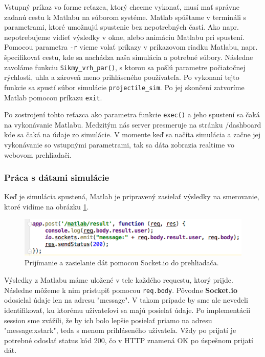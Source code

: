 Vstupný príkaz vo forme reťazca, ktorý chceme vykonať, musí mať správne zadanú cestu k Matlabu na súborom systéme. Matlab spúštame v termináli s parametrami, ktoré umožnujú spustenie bez nepotrebných častí.\cite{matlab-macos} Ako napr. nepotrebujeme vidieť výsledky v okne, alebo animáciu Matlabu pri spustení. Pomocou parametra \verb|-r| vieme volať príkazy v príkazovom riadku Matlabu, napr. špecifikovať cestu, kde sa nachádza naša simulácia a potrebné súbory. Následne zavoláme funkciu \verb|Sikmy_vrh_par()|, s ktorou sa pošlú parametre počiatočnej rýchlosti, uhla a zároveň meno prihláseného používateľa. Po vykonaní tejto funkcie sa spustí súbor simulácie \verb|projectile_sim|. Po jej skončení zatvoríme Matlab pomocou príkazu \verb|exit|.

Po zostrojení tohto reťazca ako parametra funkcie \verb|exec()| a jeho spustení sa čaká na vykonávanie Matlabu. Medzitým nás server presmeruje na stránku /dashboard kde sa čaká na údaje zo simulácie. V momente keď sa načíta simulácia a začne jej vykonávanie so vstupnými parametrami, tak sa dáta zobrazia realtime vo webovom prehliadači.

\subsubsection{Práca s dátami simulácie}
Keď je simulácia spustená, Matlab je pripravený zasielať výsledky na smerovanie, ktoré vidíme na obrázku \ref{img-express-socketio}. 

\begin{figure}[H]
  \centering
  \includegraphics[scale=0.7]{img/code/express-socketio.png}
  \caption{Prijímanie a zasielanie dát pomocou Socket.io do prehliadača.}
  \label{img-express-socketio}
\end{figure}

Výsledky z Matlabu máme uložené v tele každého requestu, ktorý prijde. Následne môžeme k nim prístupiť pomocou \verb|req.body|. Pôvodne \textbf{Socket.io} odosielal údaje len na adresu "message". V takom prípade by sme ale nevedeli identifikovať, ku ktorému uživateľovi sa majú posielať údaje. Po implementácii session sme zvážili, že by ich bolo lepšie posielať priamo na adresu "message:xstark", teda s menom prihláseného užívateľa. Vždy po prijatí je potrebné odoslať status kód 200, čo v HTTP znamená OK po úspešnom prijatí dát.


